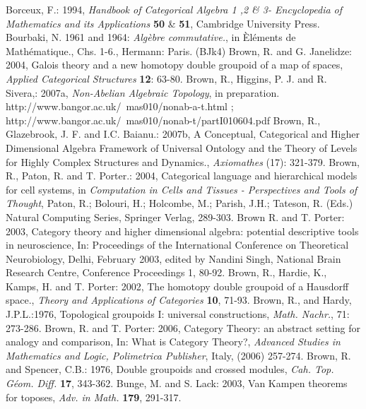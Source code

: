 \documentclass[12pt]{article}
\begin{document}
\begin{thebibliography}{199}
Borceux, F.: 1994, \emph{Handbook of Categorical Algebra 1 ,2 \& 3-
Encyclopedia of Mathematics and its Applications} \textbf{50} \& \textbf{51}, Cambridge University Press.
Bourbaki, N. 1961 and 1964: \emph{Alg\`{e}bre commutative.},
in \`{E}l\'{e}ments de Math\'{e}matique., Chs. 1-6., Hermann: Paris.
\bibitem (BJk4)
Brown, R. and G. Janelidze: 2004, Galois theory and a new homotopy
double groupoid of a map of spaces, \emph{Applied Categorical
Structures} \textbf{12}: 63-80.
Brown, R., Higgins, P. J. and R. Sivera,: 2007a, \emph{Non-Abelian
Algebraic Topology}, in preparation.\\
http://www.bangor.ac.uk/~mas010/nonab-a-t.html ; \\
http://www.bangor.ac.uk/~mas010/nonab-t/partI010604.pdf
Brown, R., Glazebrook, J. F. and I.C. Baianu.: 2007b, A Conceptual, Categorical and Higher Dimensional Algebra Framework of Universal Ontology and the Theory of Levels for Highly Complex Structures and Dynamics., \emph{Axiomathes} (17): 321-379.
Brown, R., Paton, R. and T. Porter.: 2004, Categorical language and
hierarchical models for cell systems, in \emph{Computation in
Cells and Tissues - Perspectives and Tools of Thought}, Paton, R.;
Bolouri, H.; Holcombe, M.; Parish, J.H.; Tateson, R. (Eds.)
Natural Computing Series, Springer Verlag, 289-303.
Brown R. and T. Porter: 2003, Category theory and higher
dimensional algebra: potential descriptive tools in neuroscience, In:
Proceedings of the International Conference on Theoretical
Neurobiology, Delhi, February 2003, edited by Nandini Singh,
National Brain Research Centre, Conference Proceedings 1, 80-92.
Brown, R., Hardie, K., Kamps, H. and T. Porter: 2002, The homotopy
double groupoid of a Hausdorff space., \emph{Theory and
Applications of Categories} \textbf{10}, 71-93.
Brown, R., and Hardy, J.P.L.:1976, Topological groupoids I:
universal constructions, \emph{Math. Nachr.}, 71: 273-286.
Brown, R. and T. Porter: 2006, Category Theory: an abstract
setting for analogy and comparison, In: What is Category Theory?,
\emph{Advanced Studies in Mathematics and Logic, Polimetrica
Publisher}, Italy, (2006) 257-274.
Brown, R. and Spencer, C.B.: 1976, Double groupoids and crossed
modules, \emph{Cah.  Top. G\'{e}om. Diff.} \textbf{17}, 343-362.
Bunge, M. and S. Lack: 2003, Van Kampen theorems for toposes, \emph{Adv. in Math.} \textbf{179}, 291-317.

\end{thebibliography}
\end{document}

